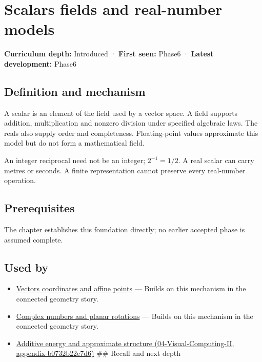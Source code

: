 \hypertarget{appendix-52051ad550fe}{}
\section{Scalars fields and real-number models}\label{appendix-52051ad550fe-scalars-fields-and-real-number-models}

\textbf{Curriculum depth:} Introduced · \textbf{First seen:} Phase6 · \textbf{Latest development:} Phase6

\subsection{Definition and mechanism}\label{appendix-52051ad550fe-definition-and-mechanism}

A scalar is an element of the field used by a vector space. A field supports addition, multiplication and nonzero division under specified algebraic laws. The reals also supply order and completeness. Floating-point values approximate this model but do not form a mathematical field.

An integer reciprocal need not be an integer; \(2^{-1}=1/2\). A real scalar can carry metres or seconds. A finite representation cannot preserve every real-number operation.

\subsection{Prerequisites}\label{appendix-52051ad550fe-prerequisites}

The chapter establishes this foundation directly; no earlier accepted phase is assumed complete.

\subsection{Used by}\label{appendix-52051ad550fe-used-by}

\begin{itemize}
\item
  \hyperref[appendix-0659864c0aa3]{Vectors coordinates and affine points} --- Builds on this mechanism in the connected geometry story.
\item
  \hyperref[appendix-f77eadcc4a93]{Complex numbers and planar rotations} --- Builds on this mechanism in the connected geometry story.
\item
  \href{../04-Visual-Computing-II/main.pdf\#nameddest=appendix-b0732b22e7d6}{Additive energy and approximate structure (04-Visual-Computing-II, appendix-b0732b22e7d6)} \#\# Recall and next depth
\end{itemize}


